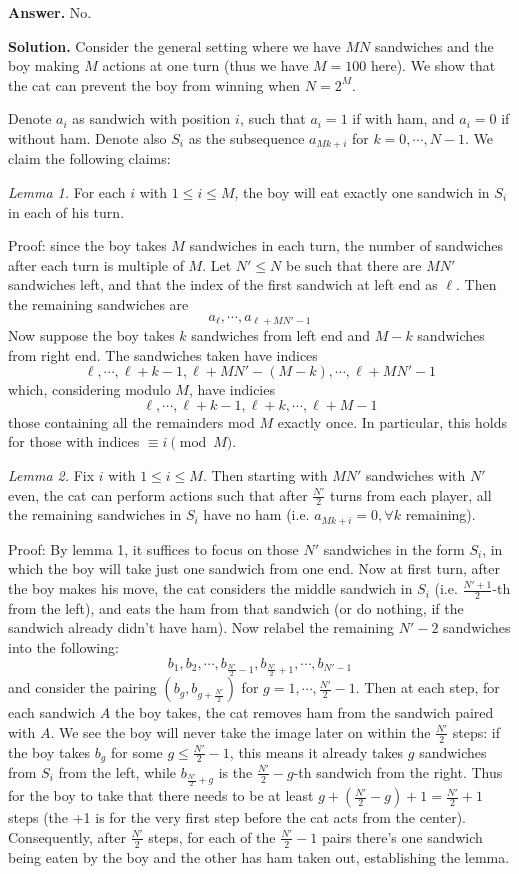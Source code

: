 \documentclass[11pt,a4paper]{article}
\begin{document}
\begin{enumerate}
	\textbf{Answer.} No. 
	
	\textbf{Solution.} Consider the general setting where we have $MN$ sandwiches and the boy making $M$ actions at one turn (thus we have $M=100$ here). 
	We show that the cat can prevent the boy from winning when $N=2^M$. 
	
	Denote $a_i$ as sandwich with position $i$, such that $a_i=1$ if with ham, and $a_i=0$ if without ham. 
	Denote also $S_i$ as the subsequence $a_{Mk+i}$ for $k=0, \cdots, N-1$. 
	We claim the following claims: 
	
	\emph{Lemma 1.} For each $i$ with $1\le i\le M$, the boy will eat exactly one sandwich in $S_i$ in each of his turn. 
	
	Proof: since the boy takes $M$ sandwiches in each turn, the number of sandwiches after each turn is multiple of $M$. 
	Let $N'\le N$ be such that there are $MN'$ sandwiches left, 
	and that the index of the first sandwich at left end as $\ell$. 
	Then the remaining sandwiches are 
	\[
	a_{\ell}, \cdots, a_{\ell+MN'-1}
	\]
	Now suppose the boy takes $k$ sandwiches from left end and $M-k$ sandwiches from right end. 
	The sandwiches taken have indices
	\[
	\ell, \cdots, \ell+k-1, \ell+MN'-(M-k), \cdots, \ell+MN'-1
	\]
	which, considering modulo $M$, have indicies 
	\[
	\ell, \cdots, \ell+k-1, \ell+k, \cdots, \ell+M-1
	\]
	those containing all the remainders mod $M$ exactly once. In particular, this holds for those with indices $\equiv i\pmod{M}$. 
	
	\emph{Lemma 2.} Fix $i$ with $1\le i\le M$. 
	Then starting with $MN'$ sandwiches with $N'$ even, 
	the cat can perform actions such that after $\frac{N'}{2}$ turns from each player, 
	all the remaining sandwiches in $S_i$ have no ham (i.e. $a_{Mk+i}=0, \forall k$ remaining). 
	
	Proof: 
	By lemma 1, it suffices to focus on those $N'$ sandwiches in the form $S_i$, in which the boy will take just one sandwich from one end. 
	Now at first turn, after the boy makes his move, the cat considers the middle sandwich in $S_i$ (i.e. $\frac{N'+1}{2}$-th from the left), 
	and eats the ham from that sandwich (or do nothing, if the sandwich already didn't have ham). 
	Now relabel the remaining $N'-2$ sandwiches into the following: 
	\[
	b_1, b_2, \cdots, b_{\frac{N'}{2}-1}, b_{\frac{N'}{2}+1}, \cdots, b_{N'-1}
	\]
	and consider the pairing $(b_g, b_{g+\frac{N'}{2}})$ for $g=1, \cdots, \frac{N'}{2}-1$. 
	Then at each step, for each sandwich $A$ the boy takes, the cat removes ham from the sandwich paired with $A$. 
	We see the boy will never take the image later on within the $\frac{N'}{2}$ steps: 
	if the boy takes $b_g$ for some $g\le \frac{N'}{2}-1$, 
	this means it already takes $g$ sandwiches from $S_i$ from the left, 
	while $b_{\frac{N'}{2}+g}$ is the $\frac{N'}{2}-g$-th sandwich from the right. 
	Thus for the boy to take that there needs to be at least $g+(\frac{N'}{2}-g)+1=\frac{N'}{2}+1$ steps 
	(the +1 is for the very first step before the cat acts from the center). 
	Consequently, after $\frac{N'}{2}$ steps, for each of the $\frac{N'}{2}-1$ pairs there's one sandwich being eaten by the boy and the other has ham taken out, establishing the lemma. 
	

\end{enumerate}
\end{document}
